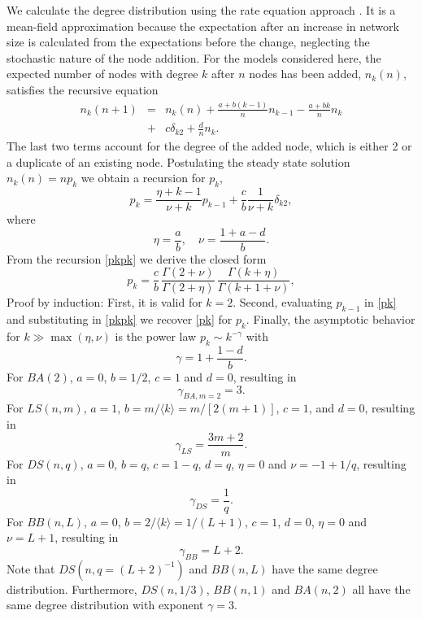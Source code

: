 \documentclass[reprint,aps,pre,amsmath,amssymb,superscriptaddress,showpacs]{revtex4-1}
\begin{document}
We calculate the degree distribution using the rate equation approach \cite{degree_dist_krapivsky00}. It is a mean-field approximation because the expectation after an increase in network size is calculated from the expectations before the change, neglecting the stochastic nature of the node addition. For the models considered here, the expected number of nodes with degree $k$ after $n$ nodes has been added, $n_k(n)$, satisfies the recursive equation
%
\begin{eqnarray}
n_k(n+1) &=& n_k(n) + \frac{a + b(k-1)}{n} n_{k-1} - \frac{a+bk}{n} n_k \nonumber\\
&+& c \delta_{k2} + \frac{d}{n} n_k.
\end{eqnarray}
%
The last two terms account for the degree of the added node, which is either 2 or a duplicate of an existing node. Postulating the steady state solution $n_k(n) = np_k$ we obtain a recursion for $p_k$,
%
\begin{equation}
p_k = \frac{\eta + k -1}{\nu+k}p_{k-1} + \frac{c}{b} \frac{1}{\nu+k}\delta_{k2},
\label{pkpk}
\end{equation}
%
where
%
\begin{equation}
\eta = \frac{a}{b}, \quad \nu = \frac{1+a-d}{b}.
\end{equation}
%
From the recursion \eqref{pkpk} we derive the closed form
%
\begin{equation}
p_k = \frac{c}{b}\,
\frac{\Gamma(2+\nu)}{\Gamma(2+\eta)}\,
\frac{\Gamma(k+\eta)}{\Gamma(k+1+\nu)},
\label{pk}
\end{equation}
%
Proof by induction: First, it is valid for $k=2$. Second, evaluating $p_{k-1}$ in \eqref{pk} and substituting in \eqref{pkpk} we recover \eqref{pk} for $p_{k}$. Finally, the asymptotic behavior for $k\gg \max(\eta, \nu)$ is the power law $p_k\sim k^{-\gamma}$ with
%
\begin{equation}
\gamma = 1 + \frac{1-d}{b}.
\end{equation}
%
For $BA(2)$, $a=0$, $b = 1/2$, $c=1$ and $d=0$, resulting in
%
\begin{equation}
\gamma_{BA, m=2} = 3.
\label{gammaBA}
\end{equation}
%
For $LS(n, m)$, $a=1$, $b=m/\langle k\rangle = m/[2(m+1)]$, $c=1$, and $d=0$, resulting in
%
\begin{equation}
\gamma_{LS} = \frac{3m+2}{m}.
\label{gammaLS}
\end{equation}
%
For $DS(n, q)$, $a=0$, $b=q$, $c=1-q$, $d=q$, $\eta=0$ and $\nu=-1+1/q$, resulting in
%
\begin{equation}
\gamma_{DS}=\frac{1}{q}.
\label{gammaDS}
\end{equation}
For $BB(n, L)$, $a=0$, $b=2/\langle k\rangle = 1/(L+1)$, $c=1$, $d=0$, $\eta=0$ and $\nu=L+1$, resulting in
%
\begin{equation}
\gamma_{BB}=L+2.
\label{gammaBB}
\end{equation}
%
Note that $DS(n, q=(L+2)^{-1})$ and $BB(n, L)$ have the same degree distribution. Furthermore, $DS(n, 1/3)$, $BB(n, 1)$ and $BA(n, 2)$ all have the same degree distribution with exponent $\gamma=3$.
\end{document}
